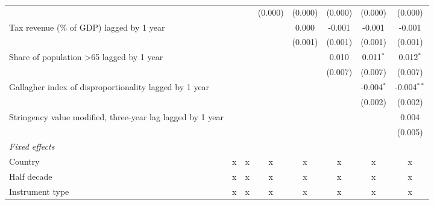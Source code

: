 \begin{tabular}{lccccccc}
                                                                                    &         &         & (0.000)      & (0.000)       & (0.000)     & (0.000)      & (0.000)\\   
   Tax revenue (\% of GDP) lagged by 1 year                                         &         &         &              & 0.000         & -0.001      & -0.001       & -0.001\\   
                                                                                    &         &         &              & (0.001)       & (0.001)     & (0.001)      & (0.001)\\   
   Share of population >65 lagged by 1 year                                         &         &         &              &               & 0.010       & 0.011$^{*}$  & 0.012$^{*}$\\   
                                                                                    &         &         &              &               & (0.007)     & (0.007)      & (0.007)\\   
   Gallagher index of disproportionality lagged by 1 year                           &         &         &              &               &             & -0.004$^{*}$ & -0.004$^{**}$\\   
                                                                                    &         &         &              &               &             & (0.002)      & (0.002)\\   
   Stringency value modified, three-year lag lagged by 1 year                       &         &         &              &               &             &              & 0.004\\   
                                                                                    &         &         &              &               &             &              & (0.005)\\   
   \emph{Fixed effects}\\
   Country                                                                          & x       & x       & x            & x             & x           & x            & x\\  
   Half decade                                                                      & x       & x       & x            & x             & x           & x            & x\\  
   Instrument type                                                                  & x       & x       & x            & x             & x           & x            & x\\  

\end{tabular}
